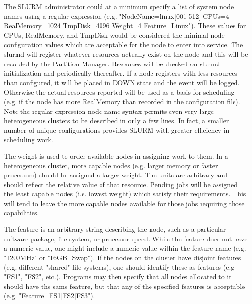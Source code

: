 The SLURM administrator could at a minimum specify a list of system node 
names using a regular expression (e.g. "NodeName=linux[001-512] CPUs=4 
RealMemory=1024 TmpDisk=4096 Weight=4 Feature=Linux"). 
These values for CPUs, RealMemory, and TmpDisk would be considered the 
minimal node configuration values which are acceptable for the node to 
enter into service. 
The slurmd will register whatever resources actually exist on the node 
and this will be recorded by the Partition Manager. 
Resources will be checked on slurmd initialization and periodically thereafter.
If a node registers with less resources than configured, it will be placed 
in DOWN state and the event will be logged. 
Otherwise the actual resources reported will be used as a basis for 
scheduling (e.g. if the node has more RealMemory than recorded in the 
configuration file).
Note the regular expression node name syntax permits even very large heterogeneous 
clusters to be described in only a few lines. 
In fact, a smaller number of unique configurations provides SLURM with 
greater efficiency in scheduling work.

The weight is used to order available nodes in assigning work to them. 
In a heterogeneous cluster, more capable nodes (e.g. larger memory or 
faster processors) should be assigned a larger weight. 
The units are arbitrary and should reflect the relative value of that resource. 
Pending jobs will be assigned the least capable nodes (i.e. lowest 
weight) which satisfy their requirements. 
This will tend to leave the more capable nodes available for those 
jobs requiring those capabilities. 

The feature is an arbitrary string describing the node, such as a 
particular software package, file system, or processor speed. 
While the feature does not have a numeric value, one might include a numeric 
value within the feature name (e.g. "1200MHz" or "16GB\_Swap").
If the nodes on the cluster have disjoint features (e.g. different 
"shared" file systems), one should identify these as features 
(e.g. "FS1", "FS2", etc.). 
Programs may then specify that all nodes allocated to it should 
have the same feature, but that any of the specified features is 
acceptable (e.g. "Feature=FS1|FS2|FS3"). 

